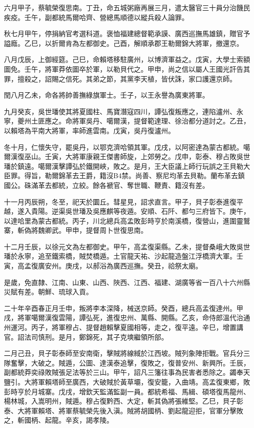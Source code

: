 \begin{pinyinscope}
六月甲子，蔡毓榮復思南。丁丑，命五城粥廠再展三月，遣太醫官三十員分治饑民疾疫。壬午，副都統馬爾哈齊、營總馬順德以縱兵殺人論罪。

秋七月甲午，停捐納官考選科道。褒恤福建總督範承謨、廣西巡撫馬雄鎮，贈官予謚廕。乙巳，以折爾肯為左都御史。己酉，解順承郡王勒爾錦大將軍，撤還京。

八月戊辰，上御經筵。己巳，命賴塔移駐廣州，以博濟軍益之。戊寅，大學士索額圖免。壬午，將軍莽依圖卒於軍，以勒貝代之。甲申，尚之信以屬人王國光訐告其罪，擅殺之，詔賜之信死。其弟之節，其黨李天植，皆伏誅，家口護還京師。

閏八月乙未，命各將帥善撫綠旗軍士。壬子，以王永譽為廣東將軍。

九月癸亥，吳世璠使其將夏國柱、馬寶潛寇四川，譚弘復叛應之，連陷瀘州、永寧，夔州土匪應之。命將軍吳丹、噶爾漢，提督範達理、徐治都分道討之。乙丑，以賴塔為平南大將軍，率師進雲南。戊寅，吳丹復瀘州。

冬十月，仁懷失守，罷吳丹，以鄂克濟哈領其軍。戊戌，以阿密達為蒙古都統。噶爾漢復巫山。壬寅，大將軍康親王傑書師旋，上郊勞之。戊申，彰泰、穆占敗吳世璠於鎮遠。噶爾漢擊譚弘於鐵開峽，敗之。是月，王大臣議上師行玩誤之王貝勒大臣罪。得旨，勒爾錦革去王爵，籍沒B4禁。尚善、察尼均革去貝勒。蘭布革去鎮國公。硃滿革去都統，立絞。餘各褫官、奪世職、鞭責、籍沒有差。

十一月丙辰朔，冬至，祀天於圜丘。彗星見，詔求直言。甲子，貝子彰泰進復平越，遂入貴陽。逆渠吳世璠及吳應麒等夜遁。安順、石阡、都勻三府皆下。庚午，以達哈里為蒙古都統。丙子，川北總兵高孟敗彭時亨於南溪橋，復營山，進圍靈鷲寨，斬偽將魏卿武。甲申，提督周卜世復思南。

十二月壬辰，以徐元文為左都御史。甲午，高孟復渠縣。乙未，提督桑峨大敗吳世璠於永寧，追至鐵索橋，賊焚橋遁。土官龍天祐、沙起龍造盤江浮橋濟大軍。壬寅，高孟復廣安州。庚戌，以郝浴為廣西巡撫。癸丑，祫祭太廟。

是歲，免直隸、江南、山東、山西、陜西、江西、福建、湖廣等省一百八十六州縣災賦有差。朝鮮、琉球入貢。

二十年辛酉春正月壬申，叛將李本深降，械送京師。癸酉，總兵高孟復達州。甲戌，將軍噶爾漢復雲陽，譚弘死，進復忠州、萬縣、開縣。乙亥，命侍郎溫代治通州運河。丙子，將軍穆占、提督趙賴擊夏國相等，走之，復平遠。辛巳，增置講官。詔法司慎刑。是月，鄭錦死，其子克塽繼領所部。

二月己丑，貝子彰泰師至安南衛，擊賊將線緎於江西坡。賊列象陣拒戰。官兵分三隊奮擊，大破之。賊遁，公圖、達漢泰追擊，復敗之，復普安州、新興所。壬辰，副都統莽奕祿敗賊張足法等於三山。甲午，詔凡三籓往事為民害者悉除之。蠲奉天鹽引。大將軍賴塔師至廣西，大破賊於黃草壩，復安籠，入曲靖。高孟復東鄉，敗彭時亨於月城寨。戊戌，增欽天監滿監副一員。都統希福、馬緝、碩塔復馬龍州、楊林城，入嵩明州，賊遁。穆占復黔西、大定，斬其偽將張維堅。乙巳，貝子彰泰、大將軍賴塔、將軍蔡毓榮先後入滇。賊將胡國柄、劉起龍迎拒，官軍分擊敗之，斬國柄、起龍。辛亥，謁孝陵。


\end{pinyinscope}

